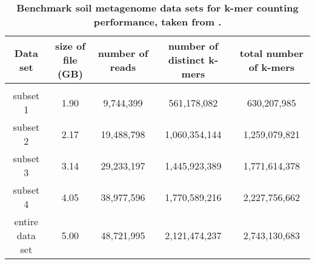\documentclass[10pt]{article}
\begin{document}
\begin{table}[!ht]
\caption{
\bf{Benchmark soil metagenome data sets for k-mer counting performance, taken from
\cite{Howe2012}.}}
\begin{tabular}{ |c | c |c| c|c| }
Data set & size of file (GB) & number of reads & number of distinct
k-mers & total number of k-mers \\
\hline \\
subset 1        & 1.90 &  9,744,399 &   561,178,082 &   630,207,985 \\
subset 2        & 2.17 & 19,488,798 & 1,060,354,144 & 1,259,079,821 \\
subset 3        & 3.14 & 29,233,197 & 1,445,923,389 & 1,771,614,378 \\
subset 4        & 4.05 & 38,977,596 & 1,770,589,216 & 2,227,756,662 \\
entire data set & 5.00 & 48,721,995 & 2,121,474,237 & 2,743,130,683 \\
\end{tabular}
\begin{flushleft}
\end{flushleft}
\label{table:datasets}
\end{table}



% 
\end{document}

